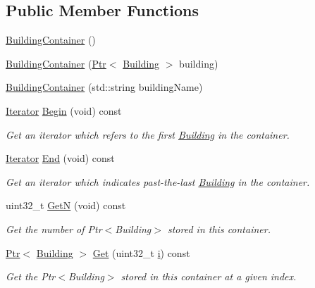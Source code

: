 \subsection*{Public Member Functions}
\begin{DoxyCompactItemize}
\item 
\hyperlink{classns3_1_1BuildingContainer_a308b0d3a25c629c5e5c934418b21f919}{Building\+Container} ()
\item 
\hyperlink{classns3_1_1BuildingContainer_a446e2def6049d4bc986331ee71fa4471}{Building\+Container} (\hyperlink{classns3_1_1Ptr}{Ptr}$<$ \hyperlink{classns3_1_1Building}{Building} $>$ building)
\item 
\hyperlink{classns3_1_1BuildingContainer_a8e70a8b916db230421b421307d0d9155}{Building\+Container} (std\+::string building\+Name)
\item 
\hyperlink{classns3_1_1BuildingContainer_afe903c6901e047ee0fa356018a0ac445}{Iterator} \hyperlink{classns3_1_1BuildingContainer_a91c467c923bd0e1e619d5e89f58a0f74}{Begin} (void) const 
\begin{DoxyCompactList}\small\item\em Get an iterator which refers to the first \hyperlink{classns3_1_1Building}{Building} in the container. \end{DoxyCompactList}\item 
\hyperlink{classns3_1_1BuildingContainer_afe903c6901e047ee0fa356018a0ac445}{Iterator} \hyperlink{classns3_1_1BuildingContainer_a59457d2417a690372733ea18ea554fea}{End} (void) const 
\begin{DoxyCompactList}\small\item\em Get an iterator which indicates past-\/the-\/last \hyperlink{classns3_1_1Building}{Building} in the container. \end{DoxyCompactList}\item 
uint32\+\_\+t \hyperlink{classns3_1_1BuildingContainer_a8048494f7e55cab06733bae816f6646b}{GetN} (void) const 
\begin{DoxyCompactList}\small\item\em Get the number of Ptr$<$\+Building$>$ stored in this container. \end{DoxyCompactList}\item 
\hyperlink{classns3_1_1Ptr}{Ptr}$<$ \hyperlink{classns3_1_1Building}{Building} $>$ \hyperlink{classns3_1_1BuildingContainer_a1b70b130da4001b16063c2057cd17052}{Get} (uint32\+\_\+t \hyperlink{lte__uplink__power__control_8m_a6f6ccfcf58b31cb6412107d9d5281426}{i}) const 
\begin{DoxyCompactList}\small\item\em Get the Ptr$<$\+Building$>$ stored in this container at a given index. \end{DoxyCompactList}\item 

\end{DoxyCompactItemize}
